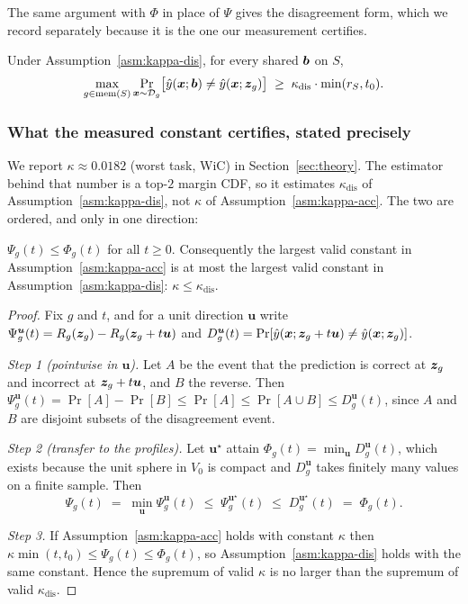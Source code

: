 \noindent The same argument with $\Phi$ in place of $\Psi$ gives the disagreement
form, which we record separately because it is the one our measurement certifies.

\begin{lemma}
\label{lem:dis-minimax}
Under Assumption~\ref{asm:kappa-dis}, for every shared $\bm{b}$ on $S$,
\begin{equation}
  \max_{g\in\mathrm{mem}(S)}
    \Pr_{\bm{x}\sim\mathcal{D}_g}\!\big[\hat y(\bm{x};\bm{b})\neq\hat y(\bm{x};\bm{z}_g)\big]
  \;\ge\; \kappa_{\mathrm{dis}}\cdot\min(r_S,t_0).
\end{equation}
\end{lemma}

\subsubsection{What the measured constant certifies, stated precisely}
\label{app:kappa-measured}

We report $\kappa\approx0.0182$ (worst task, WiC) in Section~\ref{sec:theory}. The
estimator behind that number is a top-$2$ margin CDF, so it estimates
$\kappa_{\mathrm{dis}}$ of Assumption~\ref{asm:kappa-dis}, not $\kappa$ of
Assumption~\ref{asm:kappa-acc}. The two are ordered, and only in one direction:

\begin{lemma}
\label{lem:kappa-order}
$\Psi_g(t)\le\Phi_g(t)$ for all $t\ge0$. Consequently the largest valid constant in
Assumption~\ref{asm:kappa-acc} is at most the largest valid constant in
Assumption~\ref{asm:kappa-dis}: $\kappa\le\kappa_{\mathrm{dis}}$.
\end{lemma}

\begin{proof}
Fix $g$ and $t$, and for a unit direction $\bm{u}$ write
$\Psi_g^{\bm{u}}(t)=R_g(\bm{z}_g)-R_g(\bm{z}_g+t\bm{u})$ and
$D_g^{\bm{u}}(t)=\Pr[\hat y(\bm{x};\bm{z}_g+t\bm{u})\neq\hat y(\bm{x};\bm{z}_g)]$.

\emph{Step 1 (pointwise in $\bm{u}$).} Let $A$ be the event that the prediction is
correct at $\bm{z}_g$ and incorrect at $\bm{z}_g+t\bm{u}$, and $B$ the reverse. Then
$\Psi_g^{\bm{u}}(t)=\Pr[A]-\Pr[B]\le\Pr[A]\le\Pr[A\cup B]\le D_g^{\bm{u}}(t)$,
since $A$ and $B$ are disjoint subsets of the disagreement event.

\emph{Step 2 (transfer to the profiles).} Let $\bm{u}^\star$ attain
$\Phi_g(t)=\min_{\bm{u}}D_g^{\bm{u}}(t)$, which exists because the unit sphere in
$V_0$ is compact and $D_g^{\bm{u}}$ takes finitely many values on a finite sample.
Then
\begin{equation}
  \Psi_g(t)\;=\;\min_{\bm{u}}\Psi_g^{\bm{u}}(t)
  \;\le\;\Psi_g^{\bm{u}^\star}(t)
  \;\le\;D_g^{\bm{u}^\star}(t)
  \;=\;\Phi_g(t).
\end{equation}

\emph{Step 3.} If Assumption~\ref{asm:kappa-acc} holds with constant $\kappa$ then
$\kappa\min(t,t_0)\le\Psi_g(t)\le\Phi_g(t)$, so Assumption~\ref{asm:kappa-dis}
holds with the same constant. Hence the supremum of valid $\kappa$ is no larger
than the supremum of valid $\kappa_{\mathrm{dis}}$.
\end{proof}


